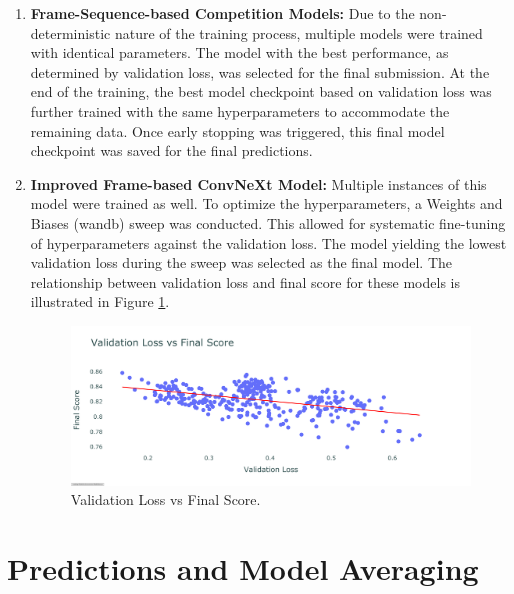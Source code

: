 \documentclass[a4paper,12pt,openright]{book}
\begin{document}
\begin{enumerate}
    \item \textbf{Frame-Sequence-based Competition Models:}
Due to the non-deterministic nature of the training process, multiple models were trained with identical parameters. The model with the best performance, as determined by validation loss, was selected for the final submission. At the end of the training, the best model checkpoint based on validation loss was further trained with the same hyperparameters to accommodate the remaining data. Once early stopping was triggered, this final model checkpoint was saved for the final predictions.
 \item \textbf{Improved Frame-based ConvNeXt Model:}
        Multiple instances of this model were trained as well. To optimize the hyperparameters, a Weights and Biases (wandb) sweep was conducted. This allowed for systematic fine-tuning of hyperparameters against the validation loss. The model yielding the lowest validation loss during the sweep was selected as the final model. The relationship between validation loss and final score for these models is illustrated in Figure \ref{fig:ValidationVsFinalScore}.


    \begin{figure}[H]
    \centering
    \includegraphics[trim={0cm 1cm 0cm 0cm},clip,width=1.1\textwidth]{images/plot.pdf}
    \caption{Validation Loss vs Final Score.}
    \label{fig:ValidationVsFinalScore}
\end{figure}

 
\end{enumerate}

\section{Predictions and Model Averaging}
\end{document}
